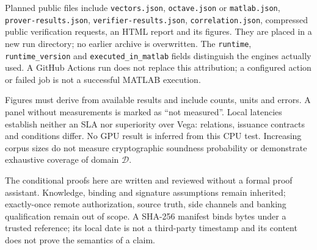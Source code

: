 \documentclass[11pt,a4paper]{article}
\newcommand{\code}[1]{\nolinkurl{#1}}
\begin{document}
Planned public files include \code{vectors.json},
\code{octave.json} or \code{matlab.json}, \code{prover-results.json},
\code{verifier-results.json}, \code{correlation.json}, compressed public
verification requests, an HTML report and its figures. They are placed
in a new run directory; no earlier archive is overwritten.
The \code{runtime}, \code{runtime_version} and
\code{executed_in_matlab} fields distinguish the engines actually used.
A GitHub Actions run does not replace this attribution; a configured action
or failed job is not a successful MATLAB execution.

Figures must derive from available results and include counts, units and
errors. A panel without measurements is marked as ``not measured''.
Local latencies establish neither an SLA nor superiority over Vega:
relations, issuance contracts and conditions differ.
No GPU result is inferred from this CPU test. Increasing corpus sizes
do not measure cryptographic soundness probability or demonstrate exhaustive
coverage of domain $\mathcal D$.

The conditional proofs here are written and reviewed without a formal proof
assistant. Knowledge, binding and signature assumptions remain inherited;
exactly-once remote authorization, source truth, side channels and banking
qualification remain out of scope. A SHA-256 manifest binds bytes under a
trusted reference; its local date is not a third-party timestamp and its
content does not prove the semantics of a claim.



\end{document}
